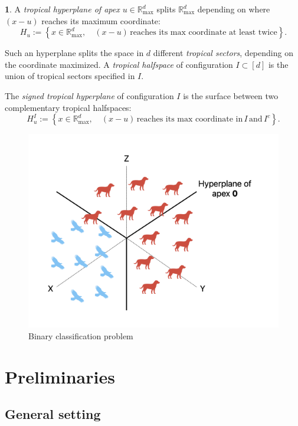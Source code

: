 \documentclass[oneside,english]{amsart}
\numberwithin{equation}{section}
\numberwithin{figure}{section}
\theoremstyle{plain}
\theoremstyle{definition}
\newtheorem{defn}[thm]{\protect\definitionname}
\theoremstyle{plain}
\theoremstyle{remark}
\theoremstyle{plain}
\theoremstyle{definition}
\theoremstyle{definition}
\providecommand{\definitionname}{Definition}
\begin{document}
\begin{defn}
A \emph{tropical hyperplane of apex $u\in\mathbb{R}_{\text{max}}^{d}$
}splits $\mathbb{R}_{\max}^{d}$ depending on where $(x-u)$ reaches
its maximum coordinate:
\[
H_{u}:=\left\{ x\in\mathbb{R}_{\max}^{d},\quad(x-u)\,\text{reaches its max coordinate at least twice}\right\} .
\]

Such an hyperplane splits the space in $d$ different \emph{tropical
sectors}, depending on the coordinate maximized. A \emph{tropical
halfspace} of configuration $I\subset[d]$ is the union of tropical
sectors specified in $I$.

The \emph{signed tropical hyperplane }of configuration $I$\emph{
}is the surface between two complementary tropical halfspaces:
\[
H_{u}^{I}:=\left\{ x\in\mathbb{R}_{\max}^{d},\quad(x-u)\,\text{reaches its max coordinate in}\,I\,\text{and}\,I^{c}\right\} .
\]
\end{defn}

\begin{figure}[h]
\label{fig:(ex)}
\includegraphics[scale=0.5]{fig/classification.png}
\caption{Binary classification problem}
\end{figure}

\section{Preliminaries}

\subsection{General setting}
\end{document}
